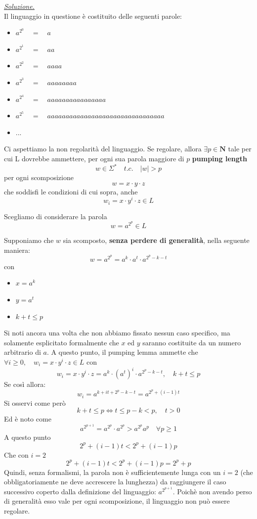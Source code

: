 \documentclass[a4paper,10pt]{article}
\begin{document}
{\begin{itemize}[label=, leftmargin=0pt]
    \begin{osservazioni}
        \underline{\textit{Soluzione.}}\\
        Il linguaggio in questione è costituito delle seguenti parole:
        \begin{itemize}
            \item $a^{2^0}\quad =\quad a$
            \item $a^{2^1}\quad =\quad aa$
            \item $a^{2^2}\quad =\quad aaaa$
            \item $a^{2^3}\quad =\quad aaaaaaaa$
            \item $a^{2^4}\quad =\quad aaaaaaaaaaaaaaaa$
            \item $a^{2^5}\quad =\quad aaaaaaaaaaaaaaaaaaaaaaaaaaaaaaaa$
            \item $...$
            
        \end{itemize}

        Ci aspettiamo la non regolarità del linguaggio. Se regolare, allora $\exists p\in \mathbf{N}$ tale per cui L dovrebbe ammettere, per ogni sua parola maggiore di $p$ \textbf{pumping length}$$w\in \Sigma^* \quad t.c.\quad |w|>p$$ per ogni scomposizione $$w=x\cdot y \cdot z$$ che soddisfi le condizioni di cui sopra, anche $$w_i=x\cdot y^i \cdot z \in L$$
        
        Scegliamo di considerare la parola $$w=a^{2^p}\in L$$
        
        Supponiamo che $w$ sia scomposto, \textbf{senza perdere di generalità}, nella seguente maniera:
        $$w=a^{2^p} = a^k\cdot a^t \cdot a^{2^p-k-t}$$
        con 
        \begin{itemize}
            \item $x=a^k$
            \item $y = a^t$
            \item $k+t\leq p$
        \end{itemize}
        Si noti ancora una volta che non abbiamo fissato nessun caso specifico, ma solamente esplicitato formalmente che $x$ ed $y$ saranno costituite da un numero arbitrario di $a$.
        A questo punto, il pumping lemma ammette che 
        $\forall i\geq 0, \quad w_i=x\cdot y^i \cdot z \in L$
        con 
        $$w_i=x\cdot y^i \cdot z=a^k \cdot (a^t)^i \cdot a^{2^p -k-t}, \quad k+t\leq p$$
        Se così allora:
        $$w_i=a^{k+it+2^p-k-t}=a^{2^p+(i-1)t}$$
        Si osservi come però
        $$k+t\leq p \Leftrightarrow t\leq p-k< p,\quad t>0$$
        Ed è noto come
        $$a^{2^{p+1}} = a^{2^{p}} \cdot a^{2^{p}}> a^{2^p}a^{p} \quad \forall p\geq1$$
        A questo punto
                $${2^p+(i-1)t} < 2^p+(i-1)p$$
        Che con $i=2$ $${2^p+(i-1)t} < 2^p+(i-1)p = 2^p+p$$
        Quindi, senza formalismi, la parola non è sufficientemente lunga con un $i=2$ (che obbligatoriamente ne deve accrescere la lunghezza) da raggiungere il caso successivo coperto dalla definizione del linguaggio: $a^{2^{p+1}}$. Poichè non avendo perso di generalità esso vale per ogni scomposizione, il linguaggio non può essere regolare.
        


\end{osservazioni}
\end{itemize}}
\end{document}
